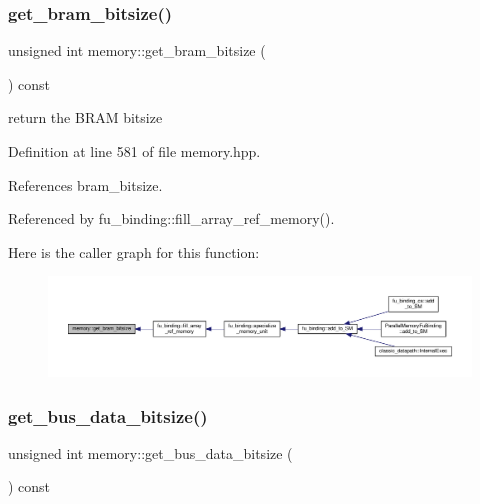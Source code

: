 \subsubsection{\texorpdfstring{get\+\_\+bram\+\_\+bitsize()}{get\_bram\_bitsize()}}
{\footnotesize\ttfamily unsigned int memory\+::get\+\_\+bram\+\_\+bitsize (\begin{DoxyParamCaption}{ }\end{DoxyParamCaption}) const\hspace{0.3cm}{\ttfamily [inline]}}



return the B\+R\+AM bitsize 



Definition at line 581 of file memory.\+hpp.



References bram\+\_\+bitsize.



Referenced by fu\+\_\+binding\+::fill\+\_\+array\+\_\+ref\+\_\+memory().

Here is the caller graph for this function\+:
\nopagebreak
\begin{figure}[H]
\begin{center}
\leavevmode
\includegraphics[width=350pt]{d8/d99/classmemory_ac82303660a64f1638acd37265f20a48a_icgraph}
\end{center}
\end{figure}
\mbox{\label{classmemory_a1db8e919be66e06ccc86dfce8fd40cec}} 
\subsubsection{\texorpdfstring{get\+\_\+bus\+\_\+data\+\_\+bitsize()}{get\_bus\_data\_bitsize()}}
{\footnotesize\ttfamily unsigned int memory\+::get\+\_\+bus\+\_\+data\+\_\+bitsize (\begin{DoxyParamCaption}{ }\end{DoxyParamCaption}) const\hspace{0.3cm}{\ttfamily [inline]}}



